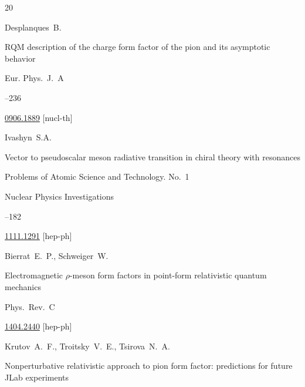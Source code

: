 \begin{thebibliography}{20}

\by Desplanques~B.

\paper   RQM description of the charge form factor of the pion and its asymptotic behavior

\jour Eur. Phys.~J.~A




--236

\arxiv \href{http://arxiv.org/abs/0906.1889}{0906.1889} [nucl-th]







\by Ivashyn~S.A.

\paper    Vector to pseudoscalar meson radiative transition in chiral theory with resonances

\inbook Problems of Atomic Science and Technology. \rm No.~1

\serial Nuclear Physics Investigations 



--182

\arxiv \href{http://arxiv.org/abs/1111.1291}{1111.1291} [hep-ph]




\by  Bierrat~E.~P., Schweiger~W.

\paper  Electromagnetic $\rho$-meson form factors in point-form relativistic quantum mechanics

\jour  Phys.~Rev.~C






\arxiv \href{http://arxiv.org/abs/1404.2440}{1404.2440} [hep-ph]








\by Krutov~A.~F., Troitsky~V.~E., Tsirova~N.~A.

\paper  Nonperturbative relativistic approach to pion form factor: predictions for future JLab experiments


\end{thebibliography}
